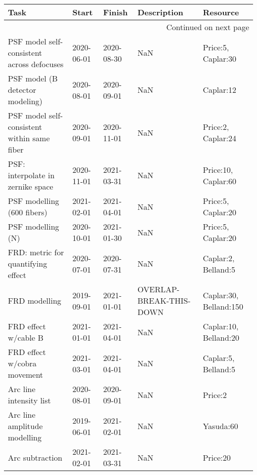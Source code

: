 \begin{longtable}{lllp{2cm}l}
\toprule
                                        Task &       Start &      Finish &              Description &                Resource \\
\midrule
\endhead
\midrule
\multicolumn{5}{r}{{Continued on next page}} \\
\midrule
\endfoot

\bottomrule
\endlastfoot
  PSF model self-consistent across defocuses &  2020-06-01 &  2020-08-30 &                      NaN &      Price:5, Caplar:30 \\
             PSF model (B detector modeling) &  2020-08-01 &  2020-09-01 &                      NaN &               Caplar:12 \\
 PSF model self-consistent within same fiber &  2020-09-01 &  2020-11-01 &                      NaN &      Price:2, Caplar:24 \\
           PSF: interpolate in zernike space &  2020-11-01 &  2021-03-31 &                      NaN &     Price:10, Caplar:60 \\
                  PSF modelling (600 fibers) &  2021-02-01 &  2021-04-01 &                      NaN &      Price:5, Caplar:20 \\
                           PSF modelling (N) &  2020-10-01 &  2021-01-30 &                      NaN &      Price:5, Caplar:20 \\
          FRD: metric for quantifying effect &  2020-07-01 &  2020-07-31 &                      NaN &     Caplar:2, Belland:5 \\
                               FRD modelling &  2019-09-01 &  2021-01-01 &  OVERLAP-BREAK-THIS-DOWN &  Caplar:30, Belland:150 \\
                        FRD effect w/cable B &  2021-01-01 &  2021-04-01 &                      NaN &   Caplar:10, Belland:20 \\
                 FRD effect w/cobra movement &  2021-03-01 &  2021-04-01 &                      NaN &     Caplar:5, Belland:5 \\
                     Arc line intensity list &  2020-08-01 &  2020-09-01 &                      NaN &                 Price:2 \\
                Arc line amplitude modelling &  2019-06-01 &  2021-02-01 &                      NaN &               Yasuda:60 \\
                             Arc subtraction &  2021-02-01 &  2021-03-31 &                      NaN &                Price:20 \\

\end{longtable}
